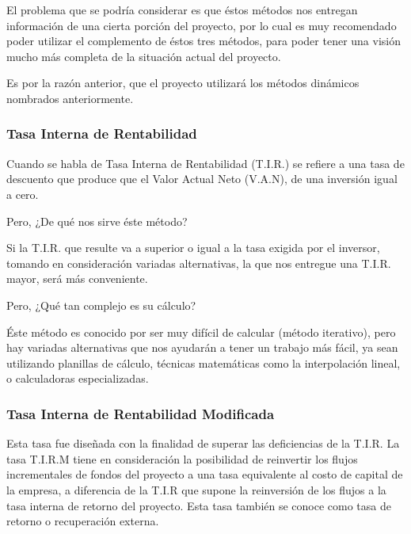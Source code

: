 El problema que se podría considerar es que éstos métodos
nos entregan información de una cierta porción del
proyecto, por lo cual es muy recomendado poder utilizar
el complemento de éstos tres métodos, para poder
tener una visión mucho más completa de la situación
actual del proyecto.

Es por la razón anterior, que el proyecto utilizará
los métodos dinámicos nombrados anteriormente.

\subsubsection{Tasa Interna de Rentabilidad}

Cuando se habla de Tasa Interna de Rentabilidad (T.I.R.)
se refiere a una tasa de descuento que produce que el Valor Actual Neto (V.A.N),
de una inversión igual a cero.

Pero, ¿De qué nos sirve éste método?

Si la T.I.R. que resulte va a superior o igual a la tasa exigida por el inversor,
tomando en consideración variadas alternativas, la que nos entregue
una T.I.R. mayor, será más conveniente.

Pero, ¿Qué tan complejo es su cálculo?

Éste método es conocido por ser muy difícil de calcular (método iterativo),
pero hay variadas alternativas que nos ayudarán a tener un trabajo más fácil, ya sean utilizando
planillas de cálculo, técnicas matemáticas como la interpolación lineal, o calculadoras
especializadas.


\subsubsection{Tasa Interna de Rentabilidad Modificada}
	Esta tasa fue diseñada con la finalidad de superar las deficiencias de la T.I.R. 
	La tasa T.I.R.M tiene en consideración la posibilidad de reinvertir los flujos incrementales de fondos del proyecto a una tasa equivalente al costo de capital de la empresa, a diferencia de la T.I.R que supone la reinversión de los flujos a la tasa interna de retorno del proyecto.
	Esta tasa también se conoce como tasa de retorno o recuperación externa.

